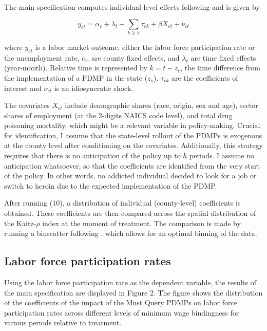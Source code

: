 \documentclass[12pt,a4paper]{article}
\begin{document}
The main specification computes individual-level effects following \textcite{Arkhangelsky2024} and is given by

\begin{equation}
    y_{ct} = \alpha_c + \lambda_t + \sum_{k\geq h}\tau_{ck} + \beta X_{ct} + \nu_{ct}
\end{equation}

where \(y_{ct}\) is a labor market outcome, either the labor force participation rate or the unemployment rate, \(\alpha_c\) are county fixed effects, and \(\lambda_t\) are time fixed effects (year-month).
Relative time is represented by \(k = t - z_c\), the time difference from the implementation of a PDMP in the state (\(z_s\)).
\(\tau_{ck}\) are the coefficients of interest and \(\nu_{ct}\) is an idiosyncratic shock.

The covariates \(X_{ct}\) include demographic shares (race, origin, sex and age), sector shares of employment (at the 2-digits NAICS code level), and total drug poisoning mortality, which might be a relevant variable in policy-making.
Crucial for identification, I assume that the state-level rollout of the PDMPs is exogenous at the county level after conditioning on the covariates.
Additionally, this strategy requires that there is no anticipation of the policy up to \(h\) periods. 
I assume no anticipation whatsoever, so that the coefficients are identified from the very start of the policy.
In other words, no addicted individual decided to look for a job or switch to heroin due to the expected implementation of the PDMP. 

After running (10), a distribution of individual (county-level) coefficients is obtained.
These coefficients are then compared across the spatial distribution of the Kaitz-\(\rho\) index at the moment of treatment.
The comparison is made by running a binscatter following \textcite{Cattaneo2024}, which allows for an optimal binning of the data.

\subsection*{Labor force participation rates}

Using the labor force participation rate as the dependent variable, the results of the main specification are displayed in Figure 2.
The figure shows the distribution of the coefficients of the impact of the Must Query PDMPs on labor force participation rates across different levels of minimum wage bindingness for various periods relative to treatment.
\end{document}
